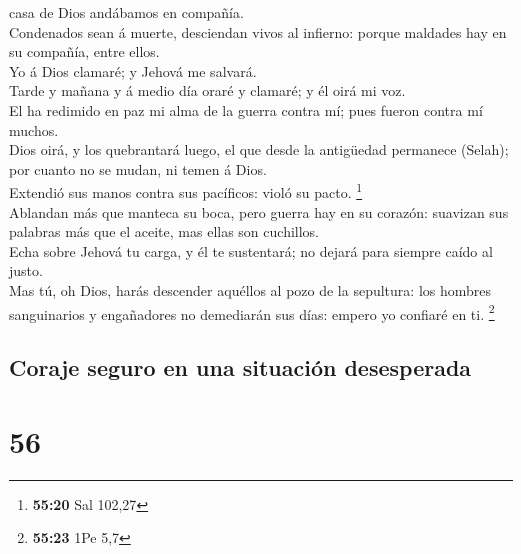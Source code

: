 casa de Dios andábamos en compañía.\\
 Condenados sean á muerte, desciendan vivos al infierno:
porque maldades hay en su compañía, entre ellos.\\
 Yo á Dios clamaré; y Jehová me salvará.\\
 Tarde y mañana y á medio día oraré y clamaré; y él oirá mi
voz.\\
 El ha redimido en paz mi alma de la guerra contra mí; pues
fueron contra mí muchos.\\
 Dios oirá, y los quebrantará luego, el que desde la
antigüedad permanece (Selah); por cuanto no se mudan, ni temen á Dios.\\
 Extendió sus manos contra sus pacíficos: violó su pacto.
\footnote{\textbf{55:20} Sal 102,27}\\
 Ablandan más que manteca su boca, pero guerra hay en su
corazón: suavizan sus palabras más que el aceite, mas ellas son
cuchillos.\\
 Echa sobre Jehová tu carga, y él te sustentará; no dejará
para siempre caído al justo.\\
 Mas tú, oh Dios, harás descender aquéllos al pozo de la
sepultura: los hombres sanguinarios y engañadores no demediarán sus
días: empero yo confiaré en ti. \footnote{\textbf{55:23} 1Pe 5,7}

\hypertarget{coraje-seguro-en-una-situaciuxf3n-desesperada}{%
\subsection{Coraje seguro en una situación
desesperada}\label{coraje-seguro-en-una-situaciuxf3n-desesperada}}

\hypertarget{section-55}{%
\section{56}\label{section-55}}

